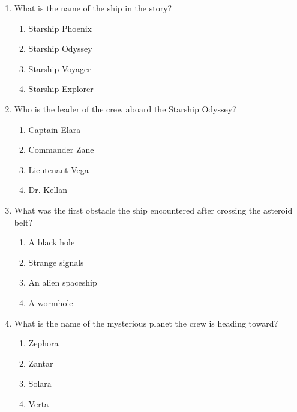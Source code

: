 \documentclass[12pt]{article}
\begin{document}
\begin{enumerate}

\item What is the name of the ship in the story?
\begin{enumerate}[label=\Alph*.]
    \item Starship Phoenix
    \item Starship Odyssey
    \item Starship Voyager
    \item Starship Explorer
\end{enumerate}

\vspace{0.5cm}

\item Who is the leader of the crew aboard the Starship Odyssey?
\begin{enumerate}[label=\Alph*.]
    \item Captain Elara
    \item Commander Zane
    \item Lieutenant Vega
    \item Dr. Kellan
\end{enumerate}

\vspace{0.5cm}

\item What was the first obstacle the ship encountered after crossing the asteroid belt?
\begin{enumerate}[label=\Alph*.]
    \item A black hole
    \item Strange signals
    \item An alien spaceship
    \item A wormhole
\end{enumerate}

\vspace{0.5cm}

\item What is the name of the mysterious planet the crew is heading toward?
\begin{enumerate}[label=\Alph*.]
    \item Zephora
    \item Zantar
    \item Solara
    \item Verta
\end{enumerate}

\vspace{0.5cm}


\end{enumerate}
\end{document}
